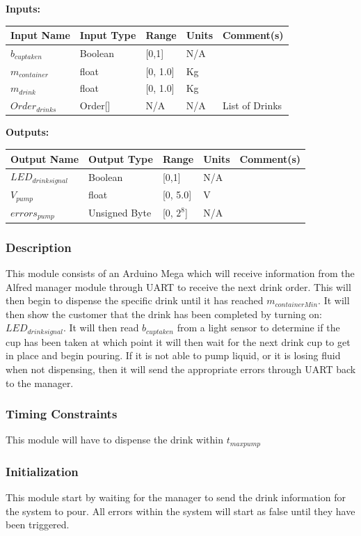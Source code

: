 \documentclass [10pt]{article}
\begin{document}
\textbf{Inputs: } 

\begin{longtable}{|l|l|l|l|l|}\hline 
		\rowcolor{tableCell}Input Name & Input Type & Range & Units & Comment(s) \\ \hline
		$ b_{cuptaken } $ & Boolean & [0,1] & N/A &  \\ \hline
		$ m_{container} $ & float & [0, 1.0]& Kg & \\ \hline
		$ m_{drink} $    & float & [0, 1.0] & Kg &  \\ \hline
		$ Order_{drinks} $ & Order[] & N/A  & N/A & List of Drinks  \\ \hline
\end{longtable}
\textbf{Outputs: } 
\begin{longtable}{|l|l|l|l|l|}\hline 
	\rowcolor{tableCell}Output Name & Output Type & Range & Units & Comment(s) \\ \hline
	$ LED_{drinksignal} $ & Boolean & [0,1] & N/A &  \\ \hline
	$ V_{pump } $ & float & [0, 5.0]& V & \\ \hline
	$  errors_{pump} $ & Unsigned Byte & [0, $2^{8}$]& N/A & \\ \hline
\end{longtable}
\subsubsection{Description}
This module consists of an Arduino Mega which will receive information from the Alfred manager module through UART to receive the next drink order. This will then begin to dispense the specific drink until it has reached $ m_{containerMin} $. It will then show the customer that the drink has been completed by turning on: $ LED_{drinksignal} $. It will then read $ b_{cuptaken} $ from a light sensor to determine if the cup has been taken at which point it will then wait for the next drink cup to get in place and begin pouring. If it is not able to pump liquid, or it is losing fluid when not dispensing, then it will send the appropriate errors through UART back to the manager.

\subsubsection{Timing Constraints}
This module will have to dispense the drink within $ t_{maxpump} $

\subsubsection{Initialization}
This module start by waiting for the manager to send the drink information for the system to pour. All errors within the system will start as false until they have been triggered.
\end{document}
